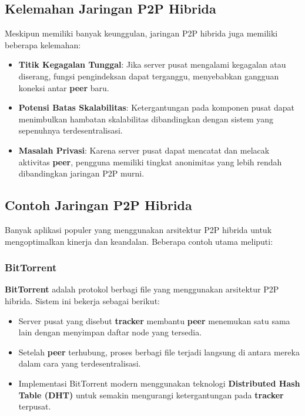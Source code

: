 \subsection{Kelemahan Jaringan P2P Hibrida}
Meskipun memiliki banyak keunggulan, jaringan P2P hibrida juga memiliki beberapa kelemahan:
\begin{itemize}
	\item \textbf{Titik Kegagalan Tunggal}: Jika server pusat mengalami kegagalan atau diserang, fungsi pengindeksan dapat terganggu, menyebabkan gangguan koneksi antar \textbf{peer} baru.
	\item \textbf{Potensi Batas Skalabilitas}: Ketergantungan pada komponen pusat dapat menimbulkan hambatan skalabilitas dibandingkan dengan sistem yang sepenuhnya terdesentralisasi.
	\item \textbf{Masalah Privasi}: Karena server pusat dapat mencatat dan melacak aktivitas \textbf{peer}, pengguna memiliki tingkat anonimitas yang lebih rendah dibandingkan jaringan P2P murni.
\end{itemize}

\subsection{Contoh Jaringan P2P Hibrida}
Banyak aplikasi populer yang menggunakan arsitektur P2P hibrida untuk mengoptimalkan kinerja dan keandalan. Beberapa contoh utama meliputi:

\subsubsection{BitTorrent}
\textbf{BitTorrent} adalah protokol berbagi file yang menggunakan arsitektur P2P hibrida. Sistem ini bekerja sebagai berikut:
\begin{itemize}
	\item Server pusat yang disebut \textbf{tracker} membantu \textbf{peer} menemukan satu sama lain dengan menyimpan daftar node yang tersedia.
	\item Setelah \textbf{peer} terhubung, proses berbagi file terjadi langsung di antara mereka dalam cara yang terdesentralisasi.
	\item Implementasi BitTorrent modern menggunakan teknologi \textbf{Distributed Hash Table (DHT)} untuk semakin mengurangi ketergantungan pada \textbf{tracker} terpusat.
\end{itemize}

